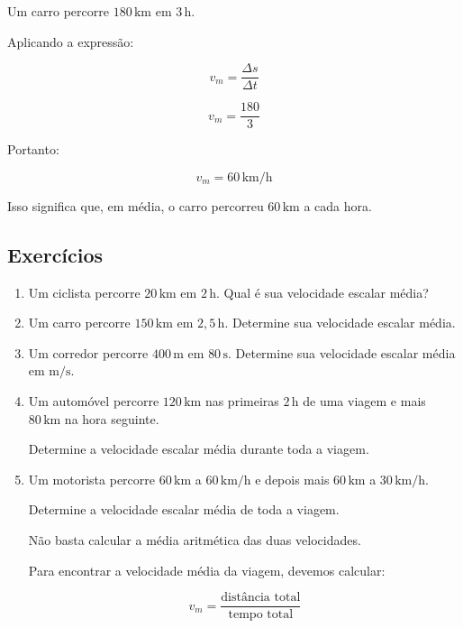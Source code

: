\documentclass[a4paper,12pt]{article}
\begin{document}
\begin{exemplo}

Um carro percorre $180\,\text{km}$ em $3\,\text{h}$.

Aplicando a expressão:

\[
v_m=\frac{\Delta s}{\Delta t}
\]

\[
v_m=\frac{180}{3}
\]

Portanto:

\[
\boxed{
v_m=60\,\text{km/h}
}
\]

Isso significa que, em média, o carro percorreu
$60\,\text{km}$ a cada hora.

\end{exemplo}


\subsection*{Exercícios}

\begin{enumerate}

\item Um ciclista percorre $20\,\text{km}$ em $2\,\text{h}$.
Qual é sua velocidade escalar média?

\vspace{1.5cm}


\item Um carro percorre $150\,\text{km}$ em $2{,}5\,\text{h}$.
Determine sua velocidade escalar média.

\vspace{1.5cm}


\item Um corredor percorre $400\,\text{m}$ em $80\,\text{s}$.
Determine sua velocidade escalar média em $\text{m/s}$.

\vspace{1.5cm}


\item Um automóvel percorre $120\,\text{km}$ nas primeiras
$2\,\text{h}$ de uma viagem e mais $80\,\text{km}$ na hora seguinte.

Determine a velocidade escalar média durante toda a viagem.

\vspace{1.5cm}


\item Um motorista percorre $60\,\text{km}$ a $60\,\text{km/h}$
e depois mais $60\,\text{km}$ a $30\,\text{km/h}$.

Determine a velocidade escalar média de toda a viagem.

\begin{atencao}

Não basta calcular a média aritmética das duas velocidades.

Para encontrar a velocidade média da viagem, devemos calcular:

\[
\boxed{
v_m=
\frac{\text{distância total}}
{\text{tempo total}}
}
\]

\end{atencao}

\end{enumerate}
\end{document}
